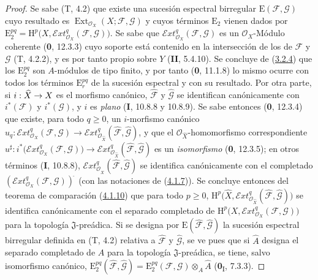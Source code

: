 \documentclass[10pt,oneside,openany]{book}
\theoremstyle{egaenv}\newtheorem*{env}{---}
\theoremstyle{egastatement}
\theoremstyle{egadescription}
\newcommand{\oldpage}[2][]{\marginnote{\normalfont\scriptsize\textbf{#1}\,|\,#2}\ignorespaces}
\renewcommand{\geq}{\geqslant}
\renewcommand{\to}{\mathchoice{\longrightarrow}{\rightarrow}{\rightarrow}{\rightarrow}}
\begin{document}
\begin{proof}
Se sabe (T, 4.2) que existe una sucesión espectral birregular
$\mathrm E(\mathcal F,\mathcal G)$ cuyo resultado es
$\operatorname{Ext}_{\mathcal O_X}(X;\mathcal F,\mathcal G)$ y cuyos términos
$\mathrm E_2$ vienen dados por
$\mathrm E_2^{pq}=\mathrm H^p\bigl(X,
\mathcal{E}\!xt^q_{\mathcal O_X}(\mathcal F,\mathcal G)\bigr)$.
Se sabe que $\mathcal{E}\!xt^q_{\mathcal O_X}(\mathcal F,\mathcal G)$ es un
$\mathcal O_X$-Módulo coherente (\textbf{0}, 12.3.3) cuyo soporte está contenido en
la intersección de los de $\mathcal F$ y $\mathcal G$ (T, 4.2.2), y es
por tanto propio sobre $Y$ (\textbf{II}, 5.4.10). Se concluye de
(\hyperref[III.3.2.4-fr]{3.2.4}) que los $\mathrm E_2^{pq}$ son
$A$-módulos de tipo finito, y por tanto (\textbf{0}, 11.1.8) lo mismo ocurre con todos
los términos $\mathrm E_r^{pq}$ de la sucesión espectral y con su resultado.
Por otra parte, si $i:\widehat X\to X$ es el morfismo canónico,
$\widehat{\mathcal F}$ y $\widehat{\mathcal G}$ se identifican canónicamente
con $i^*(\mathcal F)$ y $i^*(\mathcal G)$, y $i$ es \emph{plano} (\textbf{I}, 10.8.8 y
10.8.9). Se sabe entonces (\textbf{0}, 12.3.4) que existe, para todo $q\geq0$, un
$i$-morfismo canónico
$u_q:\mathcal{E}\!xt^q_{\mathcal O_X}(\mathcal F,\mathcal G)
\longrightarrow
\mathcal{E}\!xt^q_{\mathcal O_{\widehat X}}
(\widehat{\mathcal F},\widehat{\mathcal G})$,
y que el $\mathcal O_{\widehat X}$-homomorfismo correspondiente
$u^\sharp:i^*\bigl(\mathcal{E}\!xt^q_{\mathcal O_X}(\mathcal F,\mathcal G)\bigr)
\longrightarrow
\mathcal{E}\!xt^q_{\mathcal O_{\widehat X}}
(\widehat{\mathcal F},\widehat{\mathcal G})$
es un \emph{isomorfismo} (\textbf{0}, 12.3.5); en otros términos (\textbf{I}, 10.8.8),
$\mathcal{E}\!xt^q_{\mathcal O_{\widehat X}}
(\widehat{\mathcal F},\widehat{\mathcal G})$ se identifica canónicamente con el
completado $(\mathcal{E}\!xt^q_{\mathcal O_X}(\mathcal F,\mathcal G))^{\widehat{\,}}$ (con las
notaciones de (\hyperref[III.4.1.7-fr]{4.1.7})). Se concluye entonces del teorema de
comparación (\hyperref[III.4.1.10-fr]{4.1.10}) que para todo $p\geq0$,
$\mathrm H^p\bigl(\widehat X,
\mathcal{E}\!xt^q_{\mathcal O_{\widehat X}}
(\widehat{\mathcal F},\widehat{\mathcal G})\bigr)$
se identifica canónicamente con el separado completado
\oldpage[III]{139}
de
$\mathrm H^p\bigl(X,\mathcal{E}\!xt^q_{\mathcal O_X}
(\mathcal F,\mathcal G)\bigr)$ para la topología $\mathfrak J$-preádica.
Si se designa por $\mathrm E(\widehat{\mathcal F},
\widehat{\mathcal G})$ la sucesión espectral birregular definida en (T, 4.2)
relativa a $\widehat{\mathcal F}$ y $\widehat{\mathcal G}$, se ve pues que
si $\widehat A$ designa el separado completado de $A$ para la topología
$\mathfrak J$-preádica, se tiene, salvo isomorfismo canónico,
$\mathrm E_2^{pq}(\widehat{\mathcal F},\widehat{\mathcal G})
=\mathrm E_2^{pq}(\mathcal F,\mathcal G)\otimes_A\widehat A$
(\textbf{0}\textsubscript{I}, 7.3.3).


\end{proof}
\end{document}
